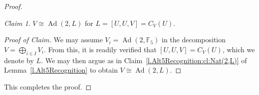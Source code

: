 \documentclass[a4paper, 11pt]{amsart}
\theoremstyle{plain}
\theoremstyle{definition}
\theoremstyle{remark}
\newtheorem{claim}{Claim}
\newenvironment{proofclaim}[1][Proof of Claim]{\begin{proof}[#1]\renewcommand{\qedsymbol}{$\lozenge$}}{\end{proof}}
\DeclareMathOperator{\Ad}{Ad}
\newcommand{\bF}{\mathbb{F}}
\begin{document}
\begin{proof}
\begin{claim}\label{cl.Ad(2,L)}
$V\cong \Ad(2, L)$ for $L = [U,U,V]= C_V(U)$.
\end{claim}
\begin{proofclaim}
We may assume $V_i = \Ad(2,\bF_5)$ in the decomposition $V = \bigoplus_{i\in I} V_i$. From this, it is readily verified that $[U,U,V] = C_V(U)$, which we denote by $L$.
We may then argue as in Claim~\ref{l.Alt5Recognition:cl:Nat(2,L)} of Lemma~\ref{l.Alt5Recognition} to obtain $V \cong \Ad(2, L)$.
%
\end{proofclaim}
This completes the proof.
\end{proof}\setcounter{claim}{0}
\end{document}
